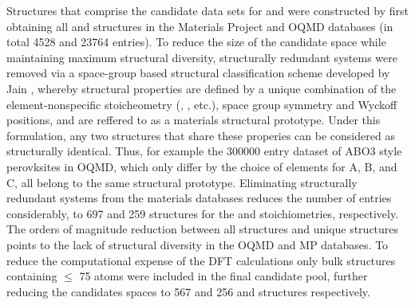 %
%
Structures that comprise the candidate data sets for \IrOtwo and \IrOthree were constructed by first obtaining all \ABtwo and \ABthree structures in the Materials Project\cite{Jain2013} and OQMD\cite{Kirklin2015} databases
(in total \num{4528} \ABtwo and \num{23764} \ABthree entries).
%
To reduce the size of the candidate space while maintaining maximum structural diversity, structurally redundant systems were removed via a space-group based structural classification scheme developed by Jain  \cite{Jain2018},
whereby structural properties are defined by a unique combination of the element-nonspecific stoicheometry (\ABtwo, \ABthree, etc.), space group symmetry and Wyckoff positions, and are reffered to as a materials structural prototype.
%
Under this formulation, any two structures that share these properies can be considered as structurally identical.
%
Thus, for example the \num{300000} entry dataset of ABO3 style perovksites in OQMD, which only differ by the choice of elements for A, B, and C, all belong to the same structural prototype.
%
Eliminating structurally redundant systems from the materials databases reduces the number of entries considerably, to \num{697} and \num{259} structures for the \ABtwo and \ABthree stoichiometries, respectively.
%
The orders of magnitude reduction between all structures and unique structures points to the lack of structural diversity in the OQMD and MP databases.
%
To reduce the computational expense of the DFT calculations only bulk structures containing $\leq$ \num{75} atoms were included in the final candidate pool, further reducing the candidates spaces to \num{567} and \num{256} \ABtwo and \ABthree structures respectively.

